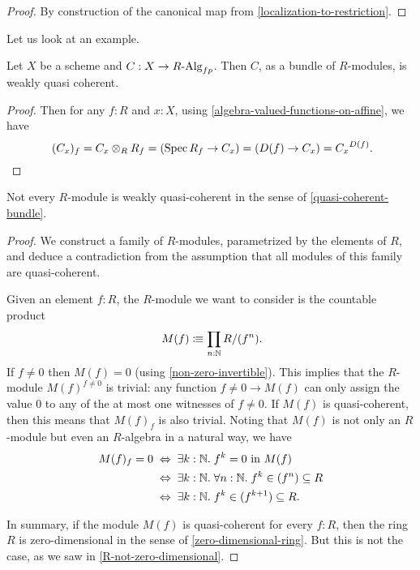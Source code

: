 \begin{proof}
  By construction of the canonical map from \cref{localization-to-restriction}.
\end{proof}

Let us look at an example.

\begin{proposition}%
  \label{fp-algebra-bundle-is-quasi-coherent}
  Let $X$ be a scheme and $C:X\to R\text{-}\mathrm{Alg}_{fp}$.
  Then $C$, as a bundle of $R$-modules, is weakly quasi coherent.
\end{proposition}

\begin{proof}
  Then for any $f:R$ and $x:X$, using \cref{algebra-valued-functions-on-affine}, we have
  \[
    (C_x)_f=C_x\otimes_R R_f=(\Spec R_f \to C_x)=(D(f)\to C_x)={C_x}^{D(f)}
    \rlap{.}
  \]
\end{proof}

\begin{proposition}%
  Not every $R$-module is weakly quasi-coherent
  in the sense of \cref{quasi-coherent-bundle}.
\end{proposition}

\begin{proof}
  We construct a family of $R$-modules,
  parametrized by the elements of $R$,
  and deduce a contradiction from the assumption that
  all modules of this family are quasi-coherent.

  Given an element $f : R$,
  the $R$-module we want to consider is
  the countable product
  \[ M(f) \colonequiv \prod_{n : \N} R/(f^n) \rlap{.} \]
  If $f \neq 0$ then $M(f) = 0$
  (using \cref{non-zero-invertible}).
  This implies that the $R$-module $M(f)^{f \neq 0}$
  is trivial:
  any function $f \neq 0 \to M(f)$ can only assign the value $0$
  to any of the at most one witnesses of $f \neq 0$.
  If $M(f)$ is quasi-coherent,
  then this means that $M(f)_f$ is also trivial.
  Noting that
  $M(f)$ is not only an $R$-module
  but even an $R$-algebra in a natural way,
  we have
  \begin{align*}
    M(f)_f = 0
    &\;\Leftrightarrow\;
    \exists k : \N.\; \text{$f^k = 0$ in $M(f)$} \\
    &\;\Leftrightarrow\;
    \exists k : \N.\; \forall n : \N.\; f^k \in (f^n) \subseteq R \\
    &\;\Leftrightarrow\;
    \exists k : \N.\; f^k \in (f^{k + 1}) \subseteq R
    \rlap{.}
  \end{align*}

  In summary,
  if the module $M(f)$ is quasi-coherent
  for every $f : R$,
  then the ring $R$ is zero-dimensional
  in the sense of \cref{zero-dimensional-ring}.
  But this is not the case,
  as we saw in \cref{R-not-zero-dimensional}.
\end{proof}

